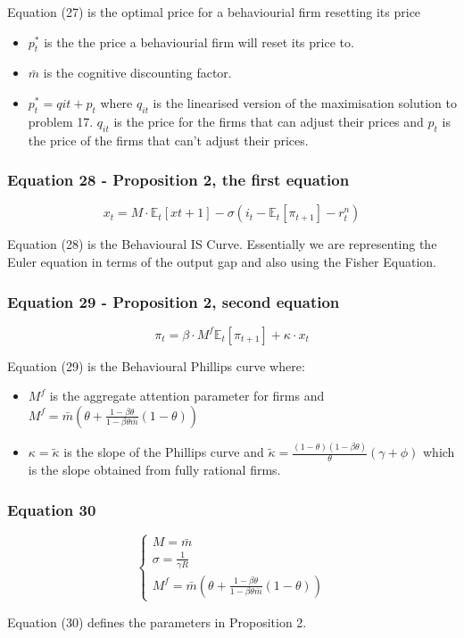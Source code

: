 \documentclass{article}
\begin{document}
Equation (27) is the optimal price for a behaviourial firm resetting its price
\begin{itemize}
    \item $p^{*}_{t}$ is the the price a behaviourial firm will reset its price to. 
    \item $\bar{m}$ is the cognitive discounting factor. 
    \item $p^{*}_{t}= q{it}+p_{t}$ where $q_{it}$ is the linearised version of the maximisation solution to problem 17. $q_{it}$ is the price for the firms that can adjust their prices and $p_{t}$ is the price of the firms that can't adjust their prices.
\end{itemize}

\subsubsection*{Equation 28 - Proposition 2, the first equation}
\begin{equation}
    x_{t}=M\cdot\mathbb{E}_{t}\left[x{t+1}\right]-\sigma(i_{t}-\mathbb{E}_{t}\left[\pi_{t+1}\right]-r^{n}_{t})
\end{equation}

Equation (28) is the Behavioural IS Curve. Essentially we are representing the Euler equation in terms of the output gap and also using the Fisher Equation.

\subsubsection*{Equation 29 - Proposition 2, second equation}
\begin{equation}
    \pi_{t}=\beta\cdot M^{f} \mathbb{E}_{t}\left[\pi_{t+1}\right]+\kappa\cdot x_{t}
\end{equation}

Equation (29) is the Behavioural Phillips curve where: 
\begin{itemize}
    \item $M^{f}$ is the aggregate attention parameter for firms and $M^{f}=\bar{m}\left(\theta+\frac{1-\beta\theta}{1-\beta\theta\bar{m}}(1-\theta)\right)$
    \item $\kappa=\widetilde{\kappa}$  is the slope of the Phillips curve and $\widetilde{\kappa} =  \frac{(1-\theta)(1-\beta\theta)}{\theta}(\gamma+\phi)$ which is the slope obtained from fully rational firms. 

\end{itemize}

\subsubsection*{Equation 30}
\begin{equation}
    \begin{cases}
        M=\bar{m} \\
        \sigma=\frac{1}{\gamma R} \\
        M^{f}=\bar{m}\left(\theta+\frac{1-\beta\theta}{1-\beta\theta\bar{m}}(1-\theta)\right)
    \end{cases}
\end{equation}

Equation (30) defines the parameters in Proposition 2.
\end{document}
